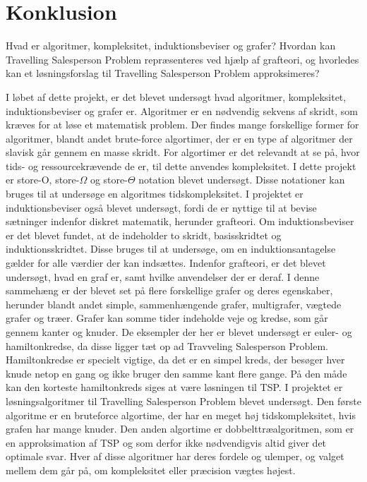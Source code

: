 \chapter{Konklusion}

Hvad er algoritmer, kompleksitet, induktionsbeviser og grafer? Hvordan kan Travelling Salesperson Problem repræsenteres ved hjælp af grafteori, og hvorledes kan et løsningsforslag til Travelling Salesperson Problem approksimeres?

I løbet af dette projekt, er det blevet undersøgt hvad algoritmer, kompleksitet, induktionsbeviser og grafer er. 
Algoritmer er en nødvendig sekvens af skridt, som kræves for at løse et matematisk problem. 
Der findes mange forskellige former for algoritmer, blandt andet brute-force algortimer, der er en type af algoritmer der slavisk går gennem en masse skridt. 
For algortimer er det relevandt at se på, hvor tids- og ressourcekrævende de er, til dette anvendes kompleksitet. 
I dette projekt er store-O, store-$\Omega$ og store-$\Theta$ notation blevet undersøgt. 
Disse notationer kan bruges til at undersøge en algoritmes tidskompleksitet. 
I projektet er induktionsbeviser også blevet undersøgt, fordi de er nyttige til at bevise sætninger indenfor diskret matematik, herunder grafteori. 
Om induktionsbeviser er det blevet fundet, at de indeholder to skridt, basisskridtet og induktionsskridtet.
Disse bruges til at undersøge, om en induktionsantagelse gælder for alle værdier der kan indsættes. 
Indenfor grafteori, er det blevet undersøgt, hvad en graf er, samt hvilke anvendelser der er deraf. 
I denne sammehæng er der blevet set på flere forskellige grafer og deres egenskaber, herunder blandt andet simple, sammenhængende grafer, multigrafer, vægtede grafer og træer. 
Grafer kan somme tider indeholde veje og kredse, som går gennem kanter og knuder. 
De eksempler der her er blevet undersøgt er euler- og hamiltonkredse, da disse ligger tæt op ad Travveling Salesperson Problem. 
Hamiltonkredse er specielt vigtige, da det er en simpel kreds, der besøger hver knude netop en gang og ikke bruger den samme kant flere gange.
På den måde kan den korteste hamiltonkreds siges at være løsningen til TSP.
I projektet er løsningsalgoritmer til Travelling Salesperson Problem blevet undersøgt. 
Den første algoritme er en bruteforce algortime, der har en meget høj tidskompleksitet, hvis grafen har mange knuder. 
Den anden algortime er dobbelttræalgoritmen, som er en approksimation af TSP og som derfor ikke nødvendigvis altid giver det optimale svar.
Hver af disse algoritmer har deres fordele og ulemper, og valget mellem dem går på, om kompleksitet eller præcision vægtes højest. 
